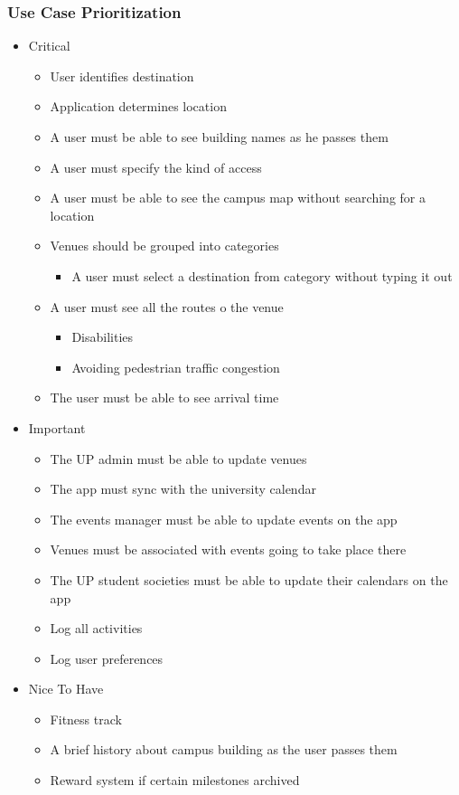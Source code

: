 \documentclass{article}
\begin{document}
		\subsubsection{Use Case Prioritization}
			\begin{itemize}
				\item Critical
					\begin{itemize}
						\item User identifies destination
						\item Application determines location
						\item A user must be able to see building names as he passes them
						\item A user must specify  the kind of access
						\item A user must be able to see the campus map without searching for a location
						\item Venues should be grouped into categories
							\begin{itemize}
							\item A user must select a destination from category without typing it out
							\end{itemize}
						\item A user must see all the routes o the venue
							\begin{itemize}
								\item Disabilities
								\item Avoiding pedestrian traffic congestion
							\end{itemize}
						\item The user must be able to see arrival time
					\end{itemize}
				\item Important
					\begin{itemize}
						\item The UP admin must be able to update venues
						\item The app must sync with the university calendar
						\item The events manager must be able to update events on the app
						\item Venues must be associated with events going to take place there
 						\item The UP student societies must be able to update their calendars on the app
						\item Log all activities
						\item Log user preferences
					\end{itemize}
				\item Nice To Have
					\begin{itemize}
						\item Fitness track
						\item A brief history about campus building as the user passes them
						\item Reward system if certain milestones archived
						
					\end{itemize}

			\end{itemize}
		
\end{document}
